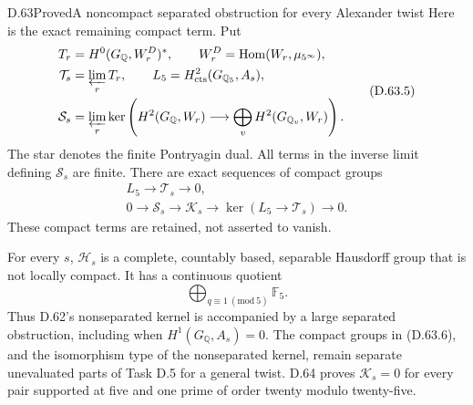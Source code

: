 \begin{statement}{D.63}{Proved}{A noncompact separated obstruction for every Alexander twist}
Here is the exact remaining compact term. Put
\[
 \begin{split}
 T_r&=H^0(G_{\mathbb Q},W_r^D)^*,\qquad
 W_r^D=\operatorname{Hom}(W_r,\mu_{5^\infty}),\\
 \mathcal T_s&=\varprojlim_r T_r,
 \qquad L_5=H^2_{\mathrm{cts}}(G_{\mathbb Q_5},A_s),\\
 \mathcal S_s&=\varprojlim_r
   \ker\left(H^2(G_{\mathbb Q},W_r)
                   \longrightarrow\bigoplus_vH^2(G_{\mathbb Q_v},W_r)\right).
 \end{split}                                             \tag{D.63.5}
\]
The star denotes the finite Pontryagin dual. All terms
in the inverse limit defining \(\mathcal S_s\) are finite.
There are exact sequences of compact groups
\[
 \begin{gathered}
 L_5\longrightarrow\mathcal T_s\longrightarrow0,\\
 0\longrightarrow\mathcal S_s\longrightarrow\mathcal K_s
     \longrightarrow\ker(L_5\longrightarrow\mathcal T_s)
     \longrightarrow0.
 \end{gathered}                                         \tag{D.63.6}
\]
These compact terms are retained, not asserted to vanish.

For every \(s\), \(\mathcal H_s\) is a complete,
countably based, separable Hausdorff group that is not
locally compact. It has a continuous quotient
\[
           \bigoplus_{q\equiv1\ (\mathrm{mod}\ 5)}\mathbb F_5.
                                                        \tag{D.63.7}
\]
Thus D.62's nonseparated kernel is accompanied by a large
separated obstruction, including when \(H^1(G_{\mathbb Q},A_s)=0\).
The compact groups in (D.63.6), and the isomorphism type of
the nonseparated kernel, remain separate unevaluated parts
of Task D.5 for a general twist. D.64 proves
\(\mathcal K_s=0\) for every pair supported at five and
one prime of order twenty modulo twenty-five.
\end{statement}

